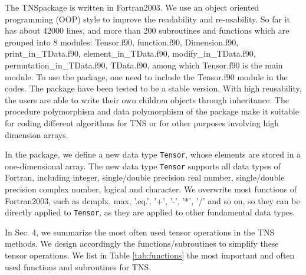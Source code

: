 \documentclass[preprint,3p,times,preprint,showpacs,amsmath,superscriptaddress,floatfix]{elsarticle}
\begin{document}
The TNSpackage is written in Fortran2003. We use an object oriented programming (OOP) style to improve the readability and re-usability. So far it has about 42000 lines, and more than 200 subroutines and functions which are grouped into 8 modules: Tensor.f90, function.f90, Dimension.f90, print\_in\_TData.f90, element\_in\_TData.f90, modify\_in\_TData.f90, permutation\_in\_TData.f90, TData.f90, among which Tensor.f90 is the main module. To use the package, one need to include the Tensor.f90 module in the codes.
The package have been tested to be a stable version. With high reusability, the users are able to write their own children objects through inheritance. The procedure polymorphism and data polymorphism of the package make it suitable for coding different algorithms for TNS or for other purposes involving high dimension arrays.


In the package, we define a new data type {\tt Tensor}, whose elements are stored in a one-dimensional array.
The new data type {\tt Tensor} supports all data types of Fortran, including integer, single/double precision real number, single/double precision complex number,
logical and character. We overwrite most functions of Fortran2003, such as dcmplx, max, '.eq.', '+', '-', '*', '/' and so on, so they
can be directly applied to {\tt Tensor}, as they are applied to other fundamental data types.


In Sec. 4, we summarize the most often used tensor operations in the TNS methods.
We design accordingly the functions/subroutines to simplify these tensor operations.
We list in Table \ref{tab:functions} the most important and often used functions and subroutines for TNS.
\end{document}
